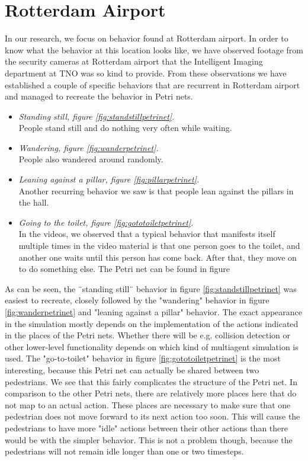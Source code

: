 \documentclass[11pt, a4paper]{book}
\begin{document}
\section{Rotterdam Airport}
\label{sec:rotterdamAirportMethod}
In our research, we focus on behavior found at Rotterdam airport. In order to know what the behavior at this location looks like, we have observed footage from the security cameras at Rotterdam airport that the Intelligent Imaging department at TNO was so kind to provide. From these observations we have established a couple of specific behaviors that are recurrent in Rotterdam airport and managed to recreate the behavior in Petri nets.
\begin{itemize}
\item \emph{Standing still, figure \ref{fig:standstillpetrinet}}.\\
People stand still and do nothing very often while waiting.

\item \emph{Wandering, figure \ref{fig:wanderpetrinet}.}\\
People also wandered around randomly.

\item \emph{Leaning against a pillar, figure \ref{fig:pillarpetrinet}.}
\\Another recurring behavior we saw is that people lean against the pillars in the hall. 

\item \emph{Going to the toilet, figure \ref{fig:gototoiletpetrinet}.}
\\In the videos, we observed that a typical behavior that manifests itself multiple times in the video material is that one person goes to the toilet, and another one waits until this person has come back. After that, they move on to do something else. The Petri net can be found in figure
\end{itemize}

 As can be seen, the ¨standing still¨ behavior in figure \ref{fig:standstillpetrinet} was easiest to recreate, closely followed by the "wandering" behavior in figure \ref{fig:wanderpetrinet} and "leaning against a pillar" behavior. The exact appearance in the simulation mostly depends on the implementation of the actions indicated in the places of the Petri nets. Whether there will be e.g. collision detection or other lower-level functionality depends on which kind of multiagent simulation is used. The "go-to-toilet" behavior in figure \ref{fig:gototoiletpetrinet} is the most interesting, because this Petri net can actually be shared between two pedestrians. We see that this fairly complicates the structure of the Petri net. In comparison to the other Petri nets, there are relatively more places here that do not map to an actual action. These places are necessary to make sure that one pedestrian does not move forward to its next action too soon. This will cause the pedestrians to have more "idle" actions between their other actions than there would be with the simpler behavior. This is not a problem though, because the pedestrians will not remain idle longer than one or two timesteps.
\end{document}
